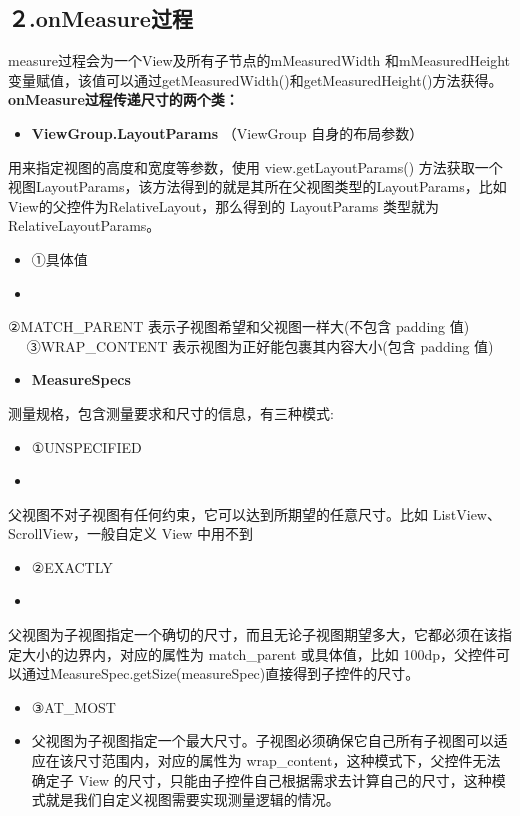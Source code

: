 \documentclass[9pt, b5paper]{article}
\begin{document}
\subsection{２.onMeasure过程}
\label{sec-11-2}
measure过程会为一个View及所有子节点的mMeasuredWidth 
和mMeasuredHeight变量赋值，该值可以通过getMeasuredWidth()和getMeasuredHeight()方法获得。
\textbf{\textbf{onMeasure过程传递尺寸的两个类：}}
\begin{itemize}
\item \textbf{\textbf{ViewGroup.LayoutParams}} （ViewGroup 自身的布局参数）
\end{itemize}
用来指定视图的高度和宽度等参数，使用 view.getLayoutParams() 方法获取一个视图LayoutParams，该方法得到的就是其所在父视图类型的LayoutParams，比如View的父控件为RelativeLayout，那么得到的 LayoutParams 类型就为RelativeLayoutParams。
\begin{itemize}
\item ①具体值 　
\item 
\end{itemize}
②MATCH\_PARENT 表示子视图希望和父视图一样大(不包含 padding 值) 　
③WRAP\_CONTENT 表示视图为正好能包裹其内容大小(包含 padding 值) 
\begin{itemize}
\item \textbf{\textbf{MeasureSpecs}}
\end{itemize}
测量规格，包含测量要求和尺寸的信息，有三种模式:

\begin{itemize}
\item ①UNSPECIFIED
\item 
\end{itemize}
父视图不对子视图有任何约束，它可以达到所期望的任意尺寸。比如 ListView、ScrollView，一般自定义 View 中用不到 
 　　 
\begin{itemize}
\item ②EXACTLY　
\item 
\end{itemize}
父视图为子视图指定一个确切的尺寸，而且无论子视图期望多大，它都必须在该指定大小的边界内，对应的属性为 match\_parent 或具体值，比如 100dp，父控件可以通过MeasureSpec.getSize(measureSpec)直接得到子控件的尺寸。
\begin{itemize}
\item ③AT\_MOST　
\item 父视图为子视图指定一个最大尺寸。子视图必须确保它自己所有子视图可以适应在该尺寸范围内，对应的属性为 wrap\_content，这种模式下，父控件无法确定子 View 的尺寸，只能由子控件自己根据需求去计算自己的尺寸，这种模式就是我们自定义视图需要实现测量逻辑的情况。　
\end{itemize}
\end{document}
